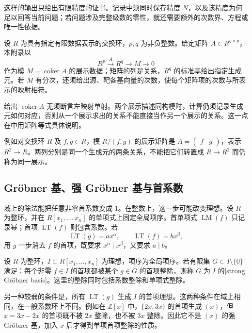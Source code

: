 这样的输出只给出有限精度的证书。记录中须同时保存精度 \(N\)，以及该精度为何足以回答当前问题；若问题涉及完整级数的零性，就还需要额外的次数界、方程或唯一性依据。

\begin{definition}\label{b3:def:B-presentation-data}
	设 \(R\) 为具有指定有限数据表示的交换环，\(p,q\) 为非负整数。给定矩阵 \(A\in R^{q\times p}\)，本附录以
	\[
		R^p\xrightarrow{A}R^q\longrightarrow M\longrightarrow0
	\]
	作为模 \(M=\operatorname{coker}A\) 的展示数据；矩阵的列是关系，\(R^q\) 的标准基给出指定生成元。若 \(M\) 有分次，还须给出源、靶各基向量的次数，使每个矩阵项的次数与所表示的映射相符。
\end{definition}

给出 \(\operatorname{coker}A\) 无须断言左映射单射。两个展示描述同构模时，计算仍须记录生成元如何对应，否则从一个展示求出的关系不能直接当作另一个展示的关系。这一点在中用矩阵等式具体说明。

例如对交换环 \(R\) 及 \(f,g\in R\)，模 \(R/(f,g)\) 的展示矩阵是 \(A=\begin{pmatrix}f&g\end{pmatrix}\)，表示 \(R^2\longrightarrow R\)。两列分别是同一个生成元的两条关系，不能把它们转置成 \(R\longrightarrow R^2\) 而仍称为同一展示。

\subsection{Gröbner 基、强 Gröbner 基与首系数}
\label{b3:subsec:B01:02}

域上的除法能把任意非零首系数变成 \(1\)。在整数上，这一步可能改变理想。设 \(R\) 为整环，并在 \(R[x_1,\ldots,x_n]\) 的单项式上固定全局项序。首单项式 \(\operatorname{LM}(f)\) 只记录幂；首项 \(\operatorname{LT}(f)\) 则包含系数。若
\[
	\operatorname{LT}(g)=a x^\alpha,\qquad \operatorname{LT}(f)=b x^\beta,
\]
用 \(g\) 一步消去 \(f\) 的首项，既要求 \(x^\alpha\mid x^\beta\)，又要求 \(a\mid b\)。

\begin{definition}\label{b3:def:B-strong-groebner}
	设 \(R\) 为整环，\(I\subset R[x_1,\ldots,x_n]\) 为理想，项序为全局项序。若有限集 \(G\subset I\setminus\{0\}\) 满足：每个非零 \(f\in I\) 的首项都被某个 \(g\in G\) 的首项整除，则称 \(G\) 为 \(I\) 的[strong Gröbner basis]。这里的整除同时包括系数整除和单项式整除。
\end{definition}

另一种较弱的条件是，所有 \(\operatorname{LT}(g)\) 生成 \(I\) 的首项理想。这两种条件在域上相同，在一般系数环上不同。例如在 \(\mathbb Z[x]\) 中，\(\{2x,3x\}\) 的首项生成 \((x)\)，但 \(x=3x-2x\) 的首项既不被 \(2x\) 整除，也不被 \(3x\) 整除。因此它不是 \((x)\) 的强 Gröbner 基，加入 \(x\) 后才得到单项首项整除的性质。

